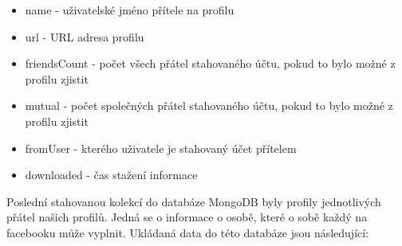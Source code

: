 \documentclass[thesis=M,czech]{FITthesis}[2013/05/10]
\begin{document}
\begin{itemize}
  \item name - uživatelské jméno přítele na profilu
  \item url - URL adresa profilu
  \item friendsCount - počet všech přátel stahovaného účtu, pokud to bylo možné z profilu zjistit
  \item mutual - počet společných přátel stahovaného účtu, pokud to bylo možné z profilu zjistit
  \item fromUser - kterého uživatele je stahovaný účet přítelem
  \item downloaded - čas stažení informace
\end{itemize}

Poslední stahovanou kolekcí do databáze MongoDB byly profily jednotlivých přátel našich profilů. Jedná se o informace o osobě, které o sobě každý na facebooku může vyplnit. Ukládaná data do této databáze jsou následující:
\end{document}
